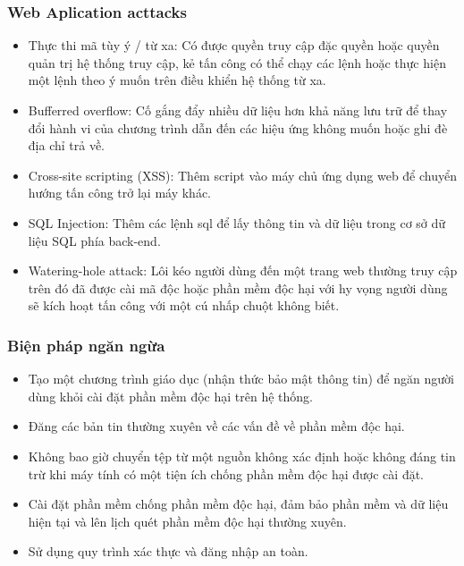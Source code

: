 \documentclass{beamer}
\begin{document}

\begin{frame}
\frametitle{Web Aplication acttacks}
 
     \begin{itemize}
    \item Thực thi mã tùy ý / từ xa: Có được quyền truy cập đặc quyền hoặc quyền quản trị hệ thống truy cập, kẻ tấn công có thể chạy các lệnh hoặc thực hiện một lệnh theo ý muốn trên điều khiển hệ thống từ xa.
    \item Bufferred overflow: Cố gắng đẩy nhiều dữ liệu hơn khả năng lưu trữ để thay đổi hành vi của chương trình dẫn đến các hiệu ứng không muốn hoặc ghi đè địa chỉ trả về.

    \item Cross-site scripting (XSS): Thêm script vào máy chủ ứng dụng web để chuyển hướng tấn công trở lại máy khác.
    \item SQL Injection:  Thêm các lệnh sql để lấy thông tin và dữ liệu trong cơ sở dữ liệu SQL phía back-end.
    \item Watering-hole attack: Lôi kéo người dùng đến một trang web thường truy cập trên đó đã được cài mã độc hoặc phần mềm độc hại với hy vọng người dùng sẽ kích hoạt tấn công với một cú nhấp chuột không biết.
\end{itemize}
\end{frame}

\begin{frame}
\frametitle{Biện pháp ngăn ngừa}
     \begin{itemize}
    \item Tạo một chương trình giáo dục (nhận thức bảo mật thông tin) để ngăn người dùng khỏi cài đặt phần mềm độc hại trên hệ thống.
    \item Đăng các bản tin thường xuyên về các vấn đề về phần mềm độc hại.
    \item Không bao giờ chuyển tệp từ một nguồn không xác định hoặc không đáng tin trừ khi máy tính có một tiện ích chống phần mềm độc hại được cài đặt.
    \item Cài đặt phần mềm chống phần mềm độc hại, đảm bảo phần mềm và dữ liệu hiện tại và lên lịch quét phần mềm độc hại thường xuyên.
    \item Sử dụng quy trình xác thực và đăng nhập an toàn.
\end{itemize}

\end{frame}
\end{document}
